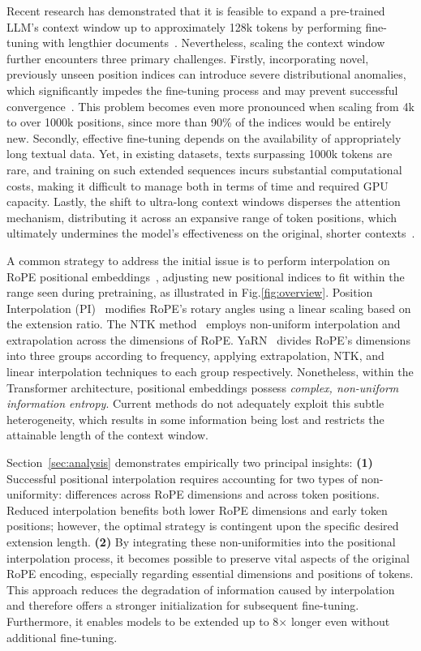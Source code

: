 Recent research has demonstrated that it is feasible to expand a pre-trained LLM’s context window up to approximately 128k tokens by performing fine-tuning with lengthier documents~\cite{longlora,pi,yarn,zhang2024soaring,liu2023scaling}. Nevertheless, scaling the context window further encounters three primary challenges. Firstly, incorporating novel, previously unseen position indices can introduce severe distributional anomalies, which significantly impedes the fine-tuning process and may prevent successful convergence~\cite{pi}. This problem becomes even more pronounced when scaling from 4k to over 1000k positions, since more than 90\% of the indices would be entirely new. Secondly, effective fine-tuning depends on the availability of appropriately long textual data. Yet, in existing datasets, texts surpassing 1000k tokens are rare, and training on such extended sequences incurs substantial computational costs, making it difficult to manage both in terms of time and required GPU capacity. Lastly, the shift to ultra-long context windows disperses the attention mechanism, distributing it across an expansive range of token positions, which ultimately undermines the model’s effectiveness on the original, shorter contexts~\cite{pi}.

A common strategy to address the initial issue is to perform interpolation on RoPE positional embeddings~\cite{rope,pi}, adjusting new positional indices to fit within the range seen during pretraining, as illustrated in Fig.\ref{fig:overview}. Position Interpolation (PI)~\cite{pi} modifies RoPE’s rotary angles using a linear scaling based on the extension ratio. The NTK method~\cite{ntk,dynamicntk} employs non-uniform interpolation and extrapolation across the dimensions of RoPE. YaRN~\cite{yarn} divides RoPE’s dimensions into three groups according to frequency, applying extrapolation, NTK, and linear interpolation techniques to each group respectively. Nonetheless, within the Transformer architecture, positional embeddings possess \emph{complex, non-uniform information entropy}. Current methods do not adequately exploit this subtle heterogeneity, which results in some information being lost and restricts the attainable length of the context window.

Section~\ref{sec:analysis} demonstrates empirically two principal insights: \textbf{(1)} Successful positional interpolation requires accounting for two types of non-uniformity: differences across RoPE dimensions and across token positions. Reduced interpolation benefits both lower RoPE dimensions and early token positions; however, the optimal strategy is contingent upon the specific desired extension length. \textbf{(2)} By integrating these non-uniformities into the positional interpolation process, it becomes possible to preserve vital aspects of the original RoPE encoding, especially regarding essential dimensions and positions of tokens. This approach reduces the degradation of information caused by interpolation and therefore offers a stronger initialization for subsequent fine-tuning. Furthermore, it enables models to be extended up to 8$\times$ longer even without additional fine-tuning.

